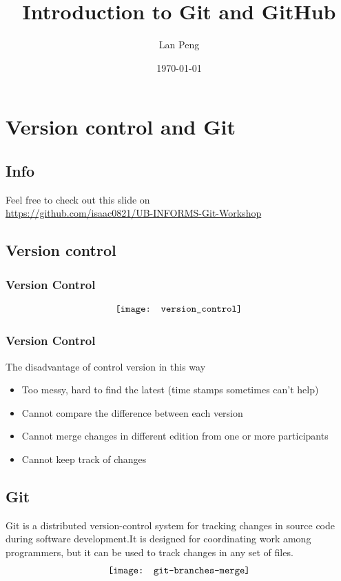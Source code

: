 \documentclass{beamer}
\title{Introduction to Git and GitHub}
\author{Lan Peng}
\institute{Department of Industrial and Systems Engineering, University at Buffalo, SUNY}
\date{\today}
\begin{document}
	\frame{\titlepage}
	

	\section{Version control and Git}
		\subsection{Info}
			\begin{frame}
				Feel free to check out this slide on\\
				\url{https://github.com/isaac0821/UB-INFORMS-Git-Workshop}				
			\end{frame}
		\subsection{Version control}
			\begin{frame}
				\frametitle{Version Control}
				\begin{align}
					\centering
					\texttt{[image: version\_control]} \nonumber
				\end{align}			
			\end{frame}

			\begin{frame}
				\frametitle{Version Control}
				The disadvantage of control version in this way
				\begin{itemize}
					\item Too messy, hard to find the latest (time stamps sometimes can't help)
					\item Cannot compare the difference between each version
					\item Cannot merge changes in different edition from one or more participants
					\item Cannot keep track of changes
				\end{itemize}
			\end{frame}
		\subsection{Git}
			\begin{frame}
				Git is a distributed version-control system for tracking changes in source code during software development.It is designed for coordinating work among programmers, but it can be used to track changes in any set of files.
				\begin{align}
					\centering
					\texttt{[image: git-branches-merge]} \nonumber
				\end{align}
			\end{frame}
\end{document}
